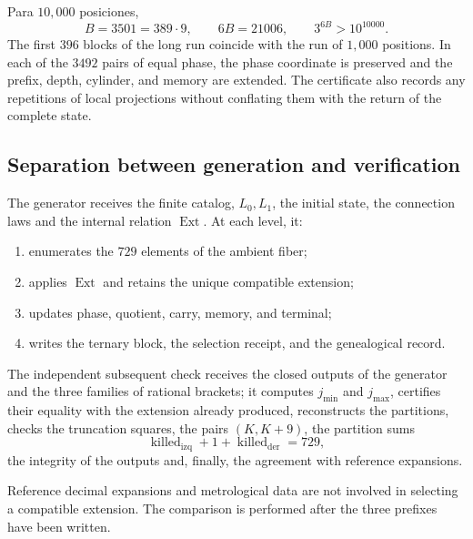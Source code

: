 Para \(10,000\) posiciones,
\[
 B=3501=389\cdot9,
 \qquad
 6B=21006,
 \qquad
 3^{6B}>10^{10000}.
\]
The first \(396\) blocks of the long run coincide with the
run of \(1,000\) positions. In each of the \(3492\) pairs of
equal phase, the phase coordinate is preserved and the prefix, depth,
cylinder, and memory are extended. The certificate also records any
repetitions of local projections without conflating them with the return of
the complete state.

\subsection{Separation between generation and verification}

\begin{definition}
The generator receives the finite catalog, \(L_0,L_1\), the initial state, the
connection laws and the internal relation \(\operatorname{Ext}\). At each level, it:
\begin{enumerate}
 \item enumerates the \(729\) elements of the ambient fiber;
 \item applies \(\operatorname{Ext}\) and retains the unique compatible extension;
 \item updates phase, quotient, carry, memory, and terminal;
 \item writes the ternary block, the selection receipt, and the genealogical record.
\end{enumerate}
\end{definition}

\begin{definition}
The independent subsequent check receives the closed outputs of the
generator and the three families of rational brackets; it computes
\(j_{\min}\) and \(j_{\max}\), certifies their equality with the extension already
produced, reconstructs the
partitions, checks the truncation squares, the pairs
\((K,K+9)\), the partition sums
\[
 \operatorname{killed}_{\mathrm{izq}}+1+\operatorname{killed}_{\mathrm{der}}=729,
\]
the integrity of the outputs and, finally, the agreement with reference expansions.
\end{definition}

\begin{theorem}
\label{p12-83-c9-s4:thm:aislamiento-datos-objetivo-precision}
Reference decimal expansions and metrological data are not
involved in selecting a compatible extension. The comparison is
performed after the three prefixes have been written.
\end{theorem}

